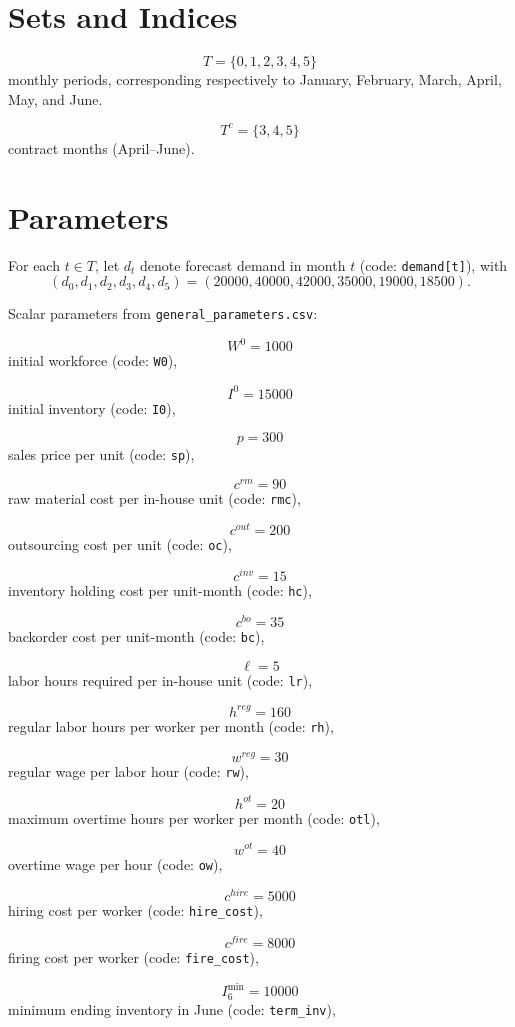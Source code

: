 \section*{Sets and Indices}

\[
T=\{0,1,2,3,4,5\}
\]
monthly periods, corresponding respectively to January, February, March, April, May, and June.

\[
T^{c}=\{3,4,5\}
\]
contract months (April--June).

\section*{Parameters}

For each \(t\in T\), let \(d_t\) denote forecast demand in month \(t\) (code: \texttt{demand[t]}), with
\[
(d_0,d_1,d_2,d_3,d_4,d_5)=(20000,40000,42000,35000,19000,18500).
\]

Scalar parameters from \texttt{general\_parameters.csv}:

\[
W^0=1000
\]
initial workforce (code: \texttt{W0}),

\[
I^0=15000
\]
initial inventory (code: \texttt{I0}),

\[
p=300
\]
sales price per unit (code: \texttt{sp}),

\[
c^{rm}=90
\]
raw material cost per in-house unit (code: \texttt{rmc}),

\[
c^{out}=200
\]
outsourcing cost per unit (code: \texttt{oc}),

\[
c^{inv}=15
\]
inventory holding cost per unit-month (code: \texttt{hc}),

\[
c^{bo}=35
\]
backorder cost per unit-month (code: \texttt{bc}),

\[
\ell=5
\]
labor hours required per in-house unit (code: \texttt{lr}),

\[
h^{reg}=160
\]
regular labor hours per worker per month (code: \texttt{rh}),

\[
w^{reg}=30
\]
regular wage per labor hour (code: \texttt{rw}),

\[
h^{ot}=20
\]
maximum overtime hours per worker per month (code: \texttt{otl}),

\[
w^{ot}=40
\]
overtime wage per hour (code: \texttt{ow}),

\[
c^{hire}=5000
\]
hiring cost per worker (code: \texttt{hire\_cost}),

\[
c^{fire}=8000
\]
firing cost per worker (code: \texttt{fire\_cost}),

\[
I^{\min}_{6}=10000
\]
minimum ending inventory in June (code: \texttt{term\_inv}),

